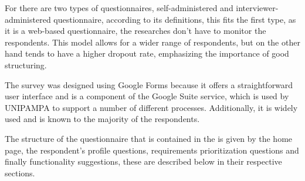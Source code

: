
For  there are two types of questionnaires, self-administered and interviewer-administered questionnaire, according to its definitions, this fits the first type, as it is a web-based questionnaire, the researches don't have to monitor the respondents.
This model allows for a wider range of respondents, but on the other hand tends to have a higher dropout rate, emphasizing the importance of good structuring.


The survey was designed using Google Forms because it offers a straightforward user interface and is a component of the Google Suite service, which is used by \ac{UNIPAMPA} to support a number of different processes. Additionally, it is widely used and is known to the majority of the respondents.


The structure of the questionnaire that is contained in the  is given by the home page, the respondent's profile questions, requirements prioritization questions and finally functionality suggestions, these are described below in their respective sections.
